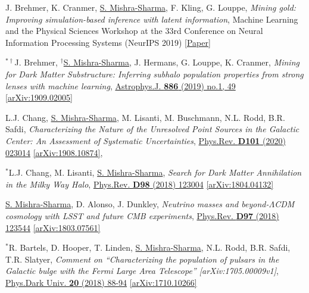 \documentclass[letterpaper,11pt]{article}
\newenvironment{packed_enumerate}[1][]{
\begin{etaremune}[#1]
  \setlength{\itemsep}{3.7pt}
  \setlength{\parskip}{0pt}
  \setlength{\parsep}{0pt}}{\end{etaremune}
}
\begin{document}
\begin{packed_enumerate}[start=38]
  \item J. Brehmer, K. Cranmer, \underline{S. Mishra-Sharma}, F. Kling, G. Louppe, \emph{Mining gold: Improving simulation-based inference with latent information}, {Machine Learning and the Physical Sciences Workshop at the 33rd Conference on Neural Information Processing Systems (NeurIPS 2019)} \href{https://ml4physicalsciences.github.io/files/NeurIPS_ML4PS_2019_16.pdf}{[Paper]}

  \item $^{*\dagger}$J. Brehmer, $^\dagger$\underline{S. Mishra-Sharma}, J. Hermans, G. Louppe, K. Cranmer, \emph{Mining for Dark Matter Substructure: Inferring subhalo population properties from strong lenses with machine learning}, \href{https://iopscience.iop.org/article/10.3847/1538-4357/ab4c41}{Astrophys.J. \textbf{886} (2019) no.1, 49} \href{https://arxiv.org/abs/1909.02005}{[arXiv:1909.02005]}

  \item L.J. Chang, \underline{S. Mishra-Sharma}, M. Lisanti, M. Buschmann, N.L. Rodd, B.R. Safdi, \emph{Characterizing the Nature of the Unresolved Point Sources in the Galactic Center: An Assessment of Systematic Uncertainties},  \href{https://journals.aps.org/prd/abstract/10.1103/PhysRevD.101.023014}{Phys.Rev. \textbf{D101} (2020) 023014} \href{https://arxiv.org/abs/1908.10874}{[arXiv:1908.10874]}, 

  \item $^*$L.J. Chang, M. Lisanti, \underline{S. Mishra-Sharma}, \emph{Search for Dark Matter Annihilation in the Milky Way Halo}, \href{https://journals.aps.org/prd/abstract/10.1103/PhysRevD.98.123004}{Phys.Rev. \textbf{D98} (2018) 123004} \href{https://arxiv.org/abs/1804.04132}{[arXiv:1804.04132]}

  \item \underline{S. Mishra-Sharma}, D. Alonso, J. Dunkley, \emph{Neutrino masses and beyond-$\Lambda$CDM cosmology with LSST and future CMB experiments}, \href{https://journals.aps.org/prd/abstract/10.1103/PhysRevD.97.123544}{Phys.Rev. \textbf{D97} (2018) 123544}  \href{https://arxiv.org/abs/1803.07561}{[arXiv:1803.07561]}

  \item $^*$R. Bartels, D. Hooper, T. Linden, \underline{S. Mishra-Sharma}, N.L. Rodd, B.R. Safdi, T.R. Slatyer, \emph{Comment on ``Characterizing the population of pulsars in the Galactic bulge with the
  {\it Fermi} Large Area Telescope'' [arXiv:1705.00009\MakeLowercase{v}1]}, \href{https://www.sciencedirect.com/science/article/pii/S2212686418300268}{Phys.Dark Univ. \textbf{20} (2018) 88-94} \href{https://arxiv.org/abs/1710.10266}{[arXiv:1710.10266]}


\end{packed_enumerate}
\end{document}
